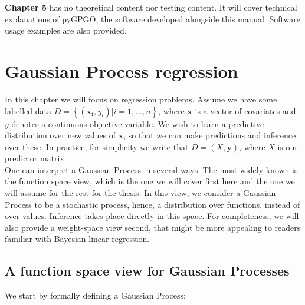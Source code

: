 \documentclass[10pt,a4paper,twoside]{book}
\begin{document}
\textbf{Chapter 5} has no theoretical content nor testing content. It will cover technical explanations of pyGPGO, the software developed alongside this manual. Software usage examples are also provided. 

\chapter{Gaussian Process regression}

 In this chapter we will focus on regression problems. Assume we have some labelled data $D = \left\lbrace \left(\boldsymbol{x_i}, y_i\right) | i = 1,\dots,n\right\rbrace$, where $\boldsymbol{x}$ is a vector of covariates and $y$ denotes a continuous objective variable. We wish to learn a predictive distribution over new values of $\boldsymbol{x}$, so that we can make predictions and inference over these. In practice, for simplicity we write that $D = \left(X, \boldsymbol{y}\right)$, where $X$ is our predictor matrix.\\

One can interpret a Gaussian Process in several ways. The most widely known is the function space view, which is the one we will cover first here and the one we will assume for the rest for the thesis. In this view, we consider a Gaussian Process to be a stochastic process, hence, a distribution over functions, instead of over values. Inference takes place directly in this space. For completeness, we will also provide a weight-space view second, that might be more appealing to readers familiar with Bayesian linear regression.\\



\section{A function space view for Gaussian Processes}

We start by formally defining a Gaussian Process:
\end{document}

